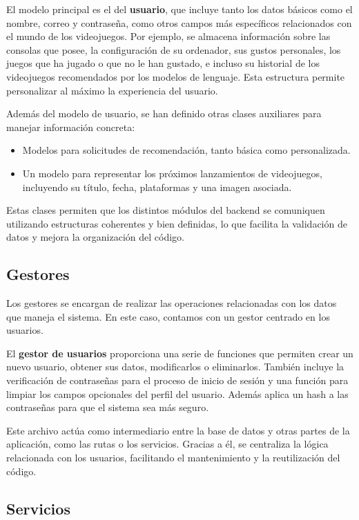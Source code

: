 El modelo principal es el del \textbf{usuario}, que incluye tanto los datos básicos como el nombre, correo y contraseña, como otros campos más específicos relacionados con el mundo de los videojuegos. Por ejemplo, se almacena información sobre las consolas que posee, la configuración de su ordenador, sus gustos personales, los juegos que ha jugado o que no le han gustado, e incluso su historial de los videojuegos recomendados por los modelos de lenguaje. Esta estructura permite personalizar al máximo la experiencia del usuario.

Además del modelo de usuario, se han definido otras clases auxiliares para manejar información concreta:
\begin{itemize}
	\item Modelos para solicitudes de recomendación, tanto básica como personalizada.
	\item Un modelo para representar los próximos lanzamientos de videojuegos, incluyendo su título, fecha, plataformas y una imagen asociada.
\end{itemize}

Estas clases permiten que los distintos módulos del backend se comuniquen utilizando estructuras coherentes y bien definidas, lo que facilita la validación de datos y mejora la organización del código.



\subsection{Gestores}

Los gestores se encargan de realizar las operaciones relacionadas con los datos que maneja el sistema. En este caso, contamos con un gestor centrado en los usuarios.

El \textbf{gestor de usuarios} proporciona una serie de funciones que permiten crear un nuevo usuario, obtener sus datos, modificarlos o eliminarlos. También incluye la verificación de contraseñas para el proceso de inicio de sesión y una función para limpiar los campos opcionales del perfil del usuario. Además aplica un hash a las contraseñas para que el sistema sea más seguro.

Este archivo actúa como intermediario entre la base de datos y otras partes de la aplicación, como las rutas o los servicios. Gracias a él, se centraliza la lógica relacionada con los usuarios, facilitando el mantenimiento y la reutilización del código.


\subsection{Servicios}

